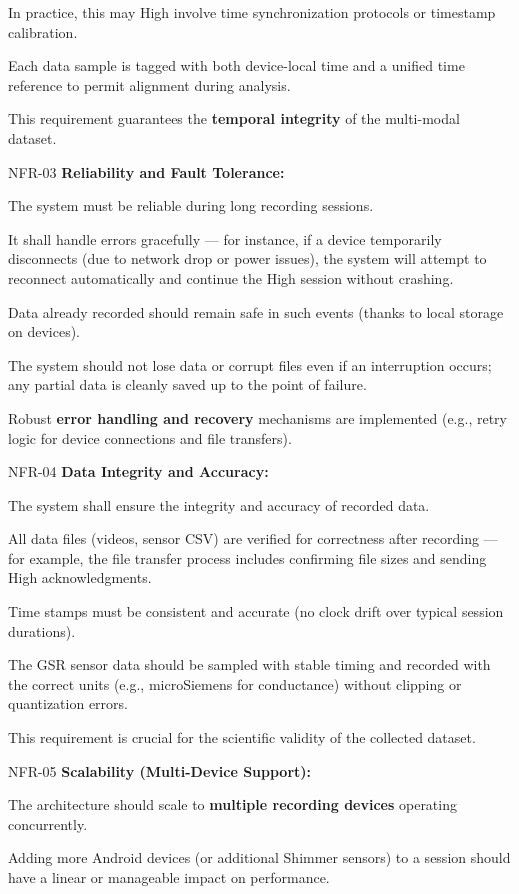 In practice, this may High involve time synchronization protocols or timestamp calibration.

Each data sample is tagged with both device-local time and a unified time reference to permit alignment during analysis.

This requirement guarantees the \textbf{temporal integrity}
 of the multi-modal dataset.

NFR-03 \textbf{Reliability and Fault Tolerance:}

The system must be reliable during long recording sessions.

It shall handle errors gracefully --- for instance, if a device temporarily disconnects (due to network drop or power issues), the system will attempt to reconnect automatically and continue the High session without crashing.

Data already recorded should remain safe in such events (thanks to local storage on devices).

The system should not lose data or corrupt files even if an interruption occurs; any partial data is cleanly saved up to the point of failure.

Robust \textbf{error handling and recovery}
 mechanisms are implemented (e.g., retry logic for device connections and file transfers).

NFR-04 \textbf{Data Integrity and Accuracy:}

The system shall ensure the integrity and accuracy of recorded data.

All data files (videos, sensor CSV) are verified for correctness after recording --- for example, the file transfer process includes confirming file sizes and sending High acknowledgments.

Time stamps must be consistent and accurate (no clock drift over typical session durations).

The GSR sensor data should be sampled with stable timing and recorded with the correct units (e.g., microSiemens for conductance) without clipping or quantization errors.

This requirement is crucial for the scientific validity of the collected dataset.

NFR-05 \textbf{Scalability (Multi-Device Support):}

The architecture should scale to \textbf{multiple recording devices}
 operating concurrently.

Adding more Android devices (or additional Shimmer sensors) to a session should have a linear or manageable impact on performance.

